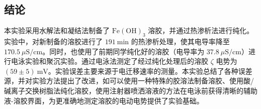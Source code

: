 \subsection{结论}

本实验采用水解法和凝结法制备了 $\mathrm{Fe}(\mathrm{OH})_3$ 溶胶，并通过热渗析法进行纯化。实验中，对新制备的溶胶进行了 $191\ \mathrm{min}$ 的热渗析处理，使其电导率降至 $170.5\ \mu \mathrm{S/cm}$。同时，也使用了前期同学纯化好的溶胶（电导率为 $37.8\ \mu \mathrm{S/cm}$）进行电泳实验和聚沉实验。通过电泳法测定了经过纯化处理后的溶胶 $\zeta$ 电势为 $(59 \pm 5)\ \mathrm{mV}$。实验误差主要来源于电迁移速率的测量。本实验总结了各种误差源，并对实验方法提出了改进，如可以使用一种特殊的胶溶法\cite{ruan2015hydroxide}制备溶胶、使用酸/碱离子交换树脂法\cite{fan2009fe}纯化溶胶，使用注射器喷洒溶液的方法在电泳前获得清晰的辅助液-溶胶界面，为更准确地测定溶胶的电动电势提供了实验基础。
\\ 
\\

